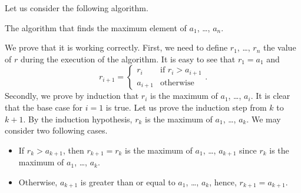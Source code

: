 Let us consider the following algorithm.
\begin{algorithm}
  \begin{algorithmic}[1]
        \EndIf
      \EndFor
      \State{}
    \EndFunction
  \end{algorithmic}
  \caption{The algorithm that finds the maximum element of $a_1$, \dots, $a_n$.}
\end{algorithm}
We prove that it is working correctly. First, we need to define $r_1$,
\dots, $r_n$ the value of $r$ during the execution of the algorithm.
It is easy to see that $r_1 = a_1$ and
\[
    r_{i + 1} =
    \begin{cases}
        r_i & \text{if } r_i > a_{i + 1} \\
        a_{i + 1} & \text{otherwise}
    \end{cases}.
\]
Secondly, we prove by induction that $r_i$ is the maximum of $a_1$, \dots,
$a_i$. It is clear that the base case for $i = 1$ is true. Let us prove the
induction step from $k$ to $k + 1$. By the induction hypothesis, $r_k$
is the maximum of $a_1$, \dots, $a_k$. We may consider two following cases.
\begin{itemize}
    \item If $r_k > a_{k + 1}$, then $r_{k + 1} = r_{k}$ is the maximum of $a_1$,
        \dots, $a_{k + 1}$ since $r_k$ is the maximum of $a_1$, \dots, $a_k$.
    \item Otherwise, $a_{k + 1}$ is greater than or equal to $a_1$, \dots, $a_k$,
        hence, $r_{k + 1} = a_{k + 1}$.
\end{itemize}

